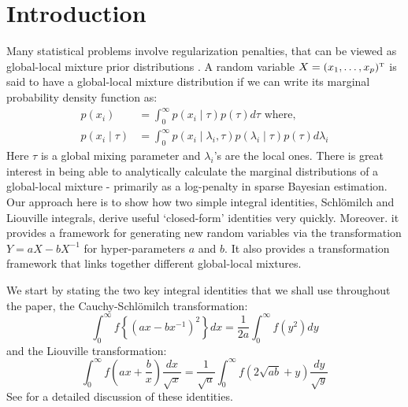 \documentclass[lineno]{biometrika}
\begin{document}
\section{Introduction}
Many statistical problems involve regularization penalties, that can be viewed as global-local mixture prior distributions \citep{polson2011data, hans2011comment}. A random variable $X = (x_1, \ldots, x_p)^{{ \mathrm{\scriptscriptstyle T} }}$ is said to have a global-local mixture distribution if we can write its marginal probability density function as: 
\begin{align*}
p(x_i) & = \int_{0}^{\infty} p(x_i \mid \tau) p(\tau) d\tau \text{ where, }\\
p( x_i \mid \tau) & = \int_{0}^{\infty} p(x_i \mid \lambda_i, \tau) p(\lambda_i \mid \tau) p(\tau) d\lambda_i
\end{align*}
Here $\tau$ is a global mixing parameter and $\lambda_i$'s are the local ones. There is great interest in being able to analytically calculate the marginal distributions of a global-local mixture - primarily as a log-penalty in sparse Bayesian estimation. Our approach here is to show how two simple integral identities, Schl\"omilch and Liouville integrals, derive useful `closed-form' identities very quickly. Moreover. it provides a framework for generating new random variables via the transformation $Y = a X - b X^{-1}$ for hyper-parameters $a$ and $b$. It also provides a transformation framework that links together different global-local mixtures. 

We start by stating the two key integral identities that we shall use throughout the paper, the Cauchy-Schl\"omilch transformation: 
\begin{equation}
\int_0^\infty f \left\{ ( a x - b x^{-1} )^2 \right\} d x = \frac{1}{2a} \int_0^\infty f(y^2) d y \label{eq:identity}
\end{equation}
and the Liouville transformation:
\begin{equation}
\int_{0}^{\infty} f\left(ax + \frac{b}{x} \right) \frac{dx}{\sqrt{x}} = \frac{1}{\sqrt{a}} \int_{0}^{\infty} f \left( 2\sqrt{ab} + y \right) \frac{dy}{\sqrt{y}} \label{eq:liouville}
\end{equation}
See \citep{boros2006irresistible,baker2008probabilistic,jones2014generating} for a detailed discussion of these identities. 
\end{document}
